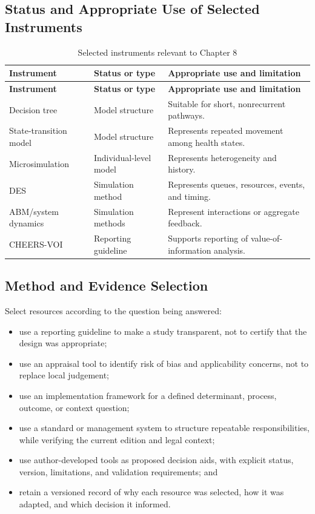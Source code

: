 \subsection{Status and Appropriate Use of Selected Instruments}
\begin{longtable}{@{}p{}p{}p{}@{}}
\caption{Selected instruments relevant to Chapter 8}
\label{tab:comp-ch08-instrument-status}\\
\toprule
\textbf{Instrument} & \textbf{Status or type} & \textbf{Appropriate use and limitation} \\
\midrule
\endfirsthead
\toprule
\textbf{Instrument} & \textbf{Status or type} & \textbf{Appropriate use and limitation} \\
\midrule
\endhead
\bottomrule
\endlastfoot
Decision tree & Model structure & Suitable for short, nonrecurrent pathways. \\
State-transition model & Model structure & Represents repeated movement among health states. \\
Microsimulation & Individual-level model & Represents heterogeneity and history. \\
DES & Simulation method & Represents queues, resources, events, and timing. \\
ABM/system dynamics & Simulation methods & Represent interactions or aggregate feedback. \\
CHEERS-VOI & Reporting guideline & Supports reporting of value-of-information analysis. \\
\end{longtable}

\subsection{Method and Evidence Selection}
Select resources according to the question being answered:
\begin{itemize}
 \item use a reporting guideline to make a study transparent, not to certify that the design was appropriate;
 \item use an appraisal tool to identify risk of bias and applicability concerns, not to replace local judgement;
 \item use an implementation framework for a defined determinant, process, outcome, or context question;
 \item use a standard or management system to structure repeatable responsibilities, while verifying the current edition and legal context;
 \item use author-developed tools as proposed decision aids, with explicit status, version, limitations, and validation requirements; and
 \item retain a versioned record of why each resource was selected, how it was adapted, and which decision it informed.
\end{itemize}

